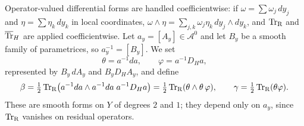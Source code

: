 Operator-valued differential forms are handled coefficientwise: if
$\omega=\sum\omega_j\,dy_j$ and $\eta=\sum\eta_k\,dy_k$ in local coordinates,
$\omega\wedge\eta=\sum_{j,k}\omega_j\eta_k\,dy_j\wedge dy_k$, and $\operatorname{Tr}_{\mathrm{R}}$ and
$\overline{\operatorname{Tr}}_{H}$ are applied coefficientwise. Let $a_y=[A_y]\in\mathcal A^0$ and let
$B_y$ be a smooth family of parametrices, so $a_y^{-1}=[B_y]$. We set
\begin{equation*}
  \theta=a^{-1}da,\qquad \varphi=a^{-1}D_Ha,
\end{equation*}
represented by $B_y\,dA_y$ and $B_yD_HA_y$, and define
\begin{equation}\label{determinants:eq:beta}
  \beta=\tfrac12\operatorname{Tr}_{\mathrm{R}}\bigl(a^{-1}da\wedge a^{-1}da\;a^{-1}D_Ha\bigr)=\tfrac12\operatorname{Tr}_{\mathrm{R}}(\theta\wedge\theta\,\varphi),\qquad
  \gamma=\tfrac12\operatorname{Tr}_{\mathrm{R}}(\theta\varphi).
\end{equation}
These are smooth forms on $Y$ of degrees $2$ and $1$; they depend only on
$a_y$, since $\operatorname{Tr}_{\mathrm{R}}$ vanishes on residual operators.

